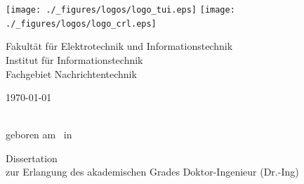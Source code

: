 \begin{titlepage}
    \pagestyle{empty}
    \centering \rmfamily \large

    \texttt{[image: ./\_figures/logos/logo\_tui.eps]}
    \hfill
    \hfill
    \texttt{[image: ./\_figures/logos/logo\_crl.eps]}
    
    { \onehalfspacing
    Fakult\"{a}t f\"{u}r Elektrotechnik und Informationstechnik\\ %
    Institut f\"{u}r Informationstechnik \\ %
    Fachgebiet Nachrichtentechnik\\ %
    }
    
    \vspace{1.5cm}
    
    {\Huge \scshape \bfseries \singlespacing \phdtitle \par}
    
    \vspace{1.0cm}
    
    \today
    
    \vspace{1.0cm}
    
    {\Large \slshape \authorname}\\
    {geboren am \dateofbirth ~in \placeofbirth}
    
    \vspace{1.0cm}
    
    {\Large Dissertation}\\ 
    {\large zur Erlangung des akademischen Grades Doktor-Ingenieur (Dr.-Ing)}
    
    \vfill
    

\end{titlepage}

